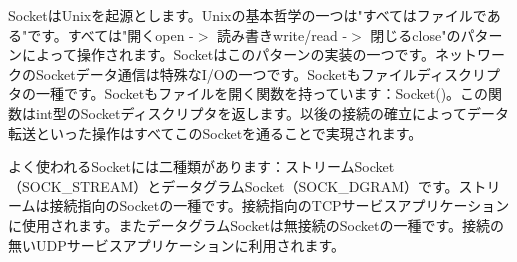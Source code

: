 SocketはUnixを起源とします。Unixの基本哲学の一つは"すべてはファイルである"です。すべては"開くopen -$>$ 読み書きwrite/read -$>$ 閉じるclose"のパターンによって操作されます。Socketはこのパターンの実装の一つです。ネットワークのSocketデータ通信は特殊なI/Oの一つです。Socketもファイルディスクリプタの一種です。Socketもファイルを開く関数を持っています：Socket()。この関数はint型のSocketディスクリプタを返します。以後の接続の確立によってデータ転送といった操作はすべてこのSocketを通ることで実現されます。

よく使われるSocketには二種類があります：ストリームSocket（SOCK\_STREAM）とデータグラムSocket（SOCK\_DGRAM）です。ストリームは接続指向のSocketの一種です。接続指向のTCPサービスアプリケーションに使用されます。またデータグラムSocketは無接続のSocketの一種です。接続の無いUDPサービスアプリケーションに利用されます。
